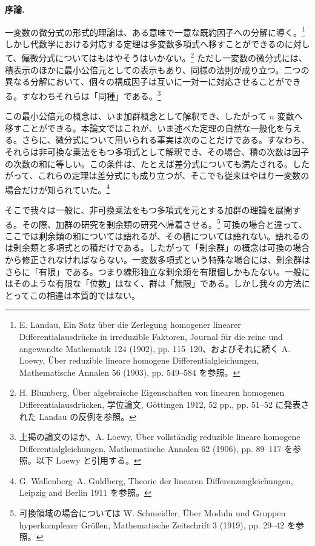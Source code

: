 \documentclass[11pt]{article}
\begin{document}
\begin{center}\textbf{序論.}\end{center}

一変数の微分式の形式的理論は、ある意味で一意な既約因子への分解に導く。\footnote{E. Landau, Ein Satz über die Zerlegung homogener linearer Differentialausdrücke in irreduzible Faktoren, Journal für die reine und angewandte Mathematik 124 (1902), pp. 115--120、およびそれに続く A. Loewy, Über reduzible lineare homogene Differentialgleichungen, Mathematische Annalen 56 (1903), pp. 549--584 を参照。} しかし代数学における対応する定理は多変数多項式へ移すことができるのに対して、偏微分式についてはもはやそうはいかない。\footnote{H. Blumberg, Über algebraische Eigenschaften von linearen homogenen Differentialausdrücken, 学位論文, Göttingen 1912, 52 pp., pp. 51--52 に発表された Landau の反例を参照。} ただし一変数の微分式には、積表示のほかに最小公倍元としての表示もあり、同様の法則が成り立つ。二つの異なる分解において、個々の構成因子は互いに一対一に対応させることができる。すなわちそれらは「同種」である。\footnote{上掲の論文のほか、A. Loewy, Über vollständig reduzible lineare homogene Differentialgleichungen, Mathematische Annalen 62 (1906), pp. 89--117 を参照。以下 Loewy と引用する。}

この最小公倍元の概念は、いま加群概念として解釈でき、したがって $n$ 変数へ移すことができる。本論文ではこれが、いま述べた定理の自然な一般化を与える。さらに、微分式について用いられる事実は次のことだけである。すなわち、それらは非可換な乗法をもつ多項式として解釈でき、その場合、積の次数は因子の次数の和に等しい。この条件は、たとえば差分式についても満たされる。したがって、これらの定理は差分式にも成り立つが、そこでも従来はやはり一変数の場合だけが知られていた。\footnote{G. Wallenberg--A. Guldberg, Theorie der linearen Differenzengleichungen, Leipzig and Berlin 1911 を参照。}

そこで我々は一般に、非可換乗法をもつ多項式を元とする加群の理論を展開する。その際、加群の研究を剰余類の研究へ帰着させる。\footnote{可換領域の場合については W. Schmeidler, Über Moduln und Gruppen hyperkomplexer Größen, Mathematische Zeitschrift 3 (1919), pp. 29--42 を参照。} 可換の場合と違って、ここでは剰余類の和については語れるが、その積については語れない。語れるのは剰余類と多項式との積だけである。したがって「剰余群」の概念は可換の場合から修正されなければならない。一変数多項式という特殊な場合には、剰余群はさらに「有限」である。つまり線形独立な剰余類を有限個しかもたない。一般にはそのような有限な「位数」はなく、群は「無限」である。しかし我々の方法にとってこの相違は本質的ではない。
\end{document}
